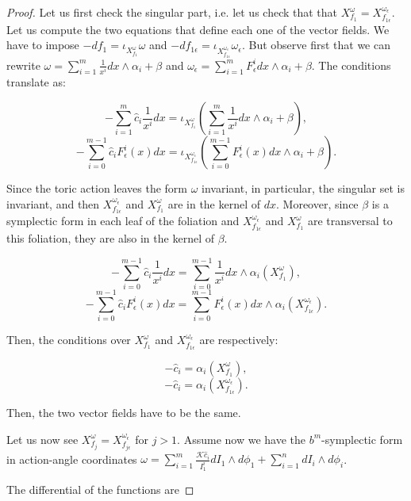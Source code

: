 \begin{proof}
Let us first check the singular part, i.e. let us check that that $X_{f_1}^\omega = X_{f_{1\epsilon}}^{\omega_\epsilon}$. Let us compute the two equations that define each one of the vector fields. We have to impose $-df_1 = \iota_{X_{f_1}^\omega}\omega$ and $-df_{1\epsilon} = \iota_{X_{f_{1\epsilon}}^{\omega_\epsilon}}\omega_\epsilon$.
But observe first that we can rewrite $\omega = \sum_{i=1}^m \frac{1}{x^i}dx\wedge\alpha_i + \beta$ and $\omega_\epsilon = \sum_{i=1}^m F_\epsilon^idx\wedge\alpha_i + \beta$. The conditions translate as:


$$-\sum_{i = 1}^{m}\hat{c}_{i} \frac{1}{x^i}dx = \iota_{X_{f_1}^\omega}\left(\sum_{i = 1}^{m} \frac{1}{x^i} dx\wedge \alpha_i + \beta\right),$$
$$-\sum_{i = 0}^{m-1}\hat{c}_i F_\epsilon^i(x)dx = \iota_{X_{f_{1\epsilon}}^{\omega_\epsilon}} \left(\sum_{i = 0}^{m-1} F_{\epsilon}^i(x) dx\wedge \alpha_i + \beta\right).$$

Since the toric action leaves the form $\omega$ invariant, in particular, the singular set is invariant, and then $X_{f_{1\epsilon}}^{\omega_\epsilon}$ and $X_{f_{1}}^{\omega}$ are in the kernel of $dx$. Moreover, since $\beta$ is a symplectic form in each leaf of the foliation and $X_{f_{1\epsilon}}^{\omega_\epsilon}$ and $X_{f_{1}}^{\omega}$ are transversal to this foliation, they are also in the kernel of $\beta$.

$$-\sum_{i = 0}^{m-1}\hat{c}_i \frac{1}{x^i}dx = \sum_{i = 0}^{m-1} \frac{1}{x^i} dx\wedge \alpha_i(X_{f_1}^\omega),$$
$$-\sum_{i = 0}^{m-1}\hat{c}_i F_\epsilon^i(x)dx = \sum_{i = 0}^{m-1} F_{\epsilon}^i(x) dx\wedge \alpha_i(X_{f_{1\epsilon}}^{\omega_\epsilon}).$$

Then, the conditions over $X_{f_1}^\omega$ and $X_{f_{1\epsilon}}^{\omega_\epsilon}$ are respectively:

$$-\hat{c}_i = \alpha_i(X_{f_1}^\omega),$$
$$-\hat{c}_i = \alpha_i(X_{f_{1\epsilon}}^{\omega_\epsilon}).$$

Then, the two vector fields have to be the same.

Let us now see $X_{f_j}^\omega = X_{f_{j\epsilon}}^{\omega_\epsilon}$ for $j > 1$.
Assume now we have the $b^m$-symplectic form in action-angle coordinates $\omega = \sum_{i=1}^m \frac{\mathcal{K}\hat c_i}{I_1^i}dI_1\wedge d\phi_1 + \sum_{i=1}^n dI_i\wedge d\phi_i$.

The differential of the functions are


\end{proof}
